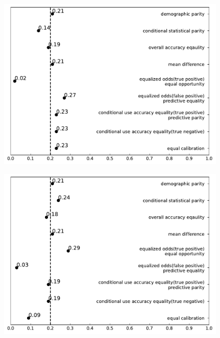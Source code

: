 \documentclass[conference]{IEEEtran}
\begin{document}
\begin{figure}[h]
\begin{minipage}[b]{0.48\linewidth}
        \centering
        \includegraphics[width=\linewidth]{Non-Asian}
        \label{fig:2}
    \end{minipage}
    \hfill
    \begin{minipage}[b]{0.48\linewidth}
        \centering
        \includegraphics[width=\linewidth]{Non-Native American}
        \label{fig:2}
    \end{minipage}
    \hfill
    \begin{minipage}[b]{0.48\linewidth}
        \centering

\end{minipage}
\end{figure}
\end{document}
